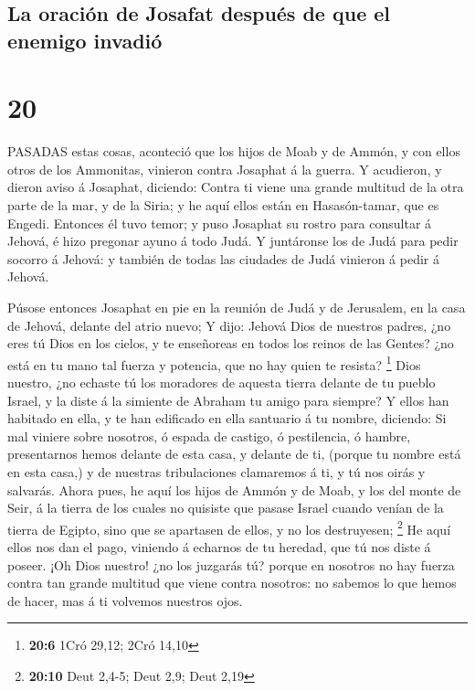 \hypertarget{la-oraciuxf3n-de-josafat-despuuxe9s-de-que-el-enemigo-invadiuxf3}{%
\subsection{La oración de Josafat después de que el enemigo
invadió}\label{la-oraciuxf3n-de-josafat-despuuxe9s-de-que-el-enemigo-invadiuxf3}}

\hypertarget{section-19}{%
\section{20}\label{section-19}}

 PASADAS estas cosas, aconteció que los hijos de Moab y de
Ammón, y con ellos otros de los Ammonitas, vinieron contra Josaphat á la
guerra.  Y acudieron, y dieron aviso á Josaphat, diciendo:
Contra ti viene una grande multitud de la otra parte de la mar, y de la
Siria; y he aquí ellos están en Hasasón-tamar, que es Engedi.
 Entonces él tuvo temor; y puso Josaphat su rostro para
consultar á Jehová, é hizo pregonar ayuno á todo Judá.  Y
juntáronse los de Judá para pedir socorro á Jehová: y también de todas
las ciudades de Judá vinieron á pedir á Jehová.

 Púsose entonces Josaphat en pie en la reunión de Judá y de
Jerusalem, en la casa de Jehová, delante del atrio nuevo;  Y
dijo: Jehová Dios de nuestros padres, ¿no eres tú Dios en los cielos, y
te enseñoreas en todos los reinos de las Gentes? ¿no está en tu mano tal
fuerza y potencia, que no hay quien te resista? \footnote{\textbf{20:6}
  1Cró 29,12; 2Cró 14,10}  Dios nuestro, ¿no echaste tú los
moradores de aquesta tierra delante de tu pueblo Israel, y la diste á la
simiente de Abraham tu amigo para siempre?  Y ellos han
habitado en ella, y te han edificado en ella santuario á tu nombre,
diciendo:  Si mal viniere sobre nosotros, ó espada de
castigo, ó pestilencia, ó hambre, presentarnos hemos delante de esta
casa, y delante de ti, (porque tu nombre está en esta casa,) y de
nuestras tribulaciones clamaremos á ti, y tú nos oirás y salvarás.
 Ahora pues, he aquí los hijos de Ammón y de Moab, y los
del monte de Seir, á la tierra de los cuales no quisiste que pasase
Israel cuando venían de la tierra de Egipto, sino que se apartasen de
ellos, y no los destruyesen; \footnote{\textbf{20:10} Deut 2,4-5; Deut
  2,9; Deut 2,19}  He aquí ellos nos dan el pago, viniendo
á echarnos de tu heredad, que tú nos diste á poseer.  ¡Oh
Dios nuestro! ¿no los juzgarás tú? porque en nosotros no hay fuerza
contra tan grande multitud que viene contra nosotros: no sabemos lo que
hemos de hacer, mas á ti volvemos nuestros ojos.

